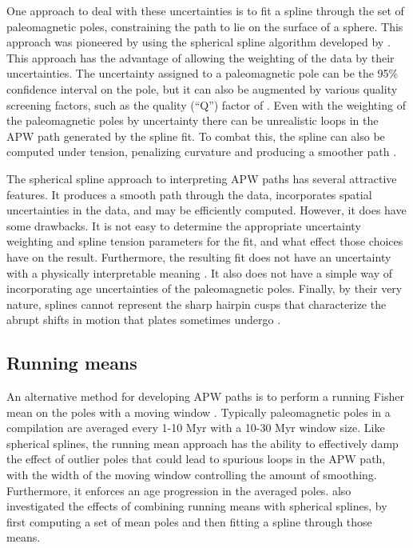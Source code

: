 \documentclass[preprint,12pt,authoryear]{elsarticle}
\begin{document}
One approach to deal with these uncertainties is to fit a spline through the
set of paleomagnetic poles, constraining the path to lie on the surface of a sphere.
This approach was pioneered by \citet{torsvik1992baltica} using the spherical spline
algorithm developed by \citet{jupp1987fitting}.
This approach has the advantage of allowing the weighting of the data by their
uncertainties. The uncertainty assigned to a paleomagnetic pole can
be the 95\% confidence interval on the pole, but it can also be augmented
by various quality screening factors, such as the quality (``Q'') factor of \citet{van1990reliability} \citep{torsvik1992baltica}. 
Even with the weighting of the paleomagnetic poles by uncertainty there
can be unrealistic loops in the APW path generated by the spline fit.
To combat this, the spline can also be computed under tension, penalizing
curvature and producing a smoother path \citep{torsvik1996continental}.

The spherical spline approach to interpreting APW paths has several attractive features.
It produces a smooth path through the data, incorporates spatial uncertainties
in the data, and may be efficiently computed.
However, it does have some drawbacks.
It is not easy to determine the appropriate uncertainty weighting and spline
tension parameters for the fit, and what effect those choices have on the result.
Furthermore, the resulting fit does not have an uncertainty with a physically
interpretable meaning \citep{torsvik1996continental}.
It also does not have a simple way of incorporating age uncertainties of the paleomagnetic poles.
Finally, by their very nature, splines cannot represent the sharp hairpin cusps
that characterize the abrupt shifts in motion that plates sometimes undergo \citep{irving1972hairpins, gordon1984paleomagnetic}.

\subsection{Running means}
\label{sec:running_means}
An alternative method for developing APW paths is to perform a running Fisher
mean on the poles with a moving window \citep{van2001evidence, torsvik2008global}.
Typically paleomagnetic poles in a compilation are averaged every 1-10 Myr with a 10-30 Myr
window size. Like spherical splines, the running mean approach has the ability
to effectively damp the effect of outlier poles that could lead to spurious loops in the APW path, with the width
of the moving window controlling the amount of smoothing.
Furthermore, it enforces an age progression in the averaged poles.
\citet{torsvik2008global} also investigated the effects of combining running means
with spherical splines, by first computing a set of mean poles and then
fitting a spline through those means.
\end{document}
